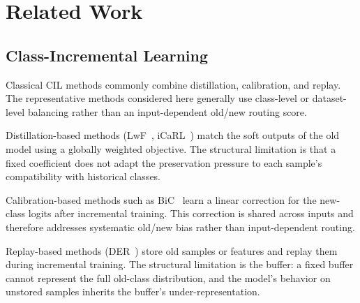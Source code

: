 %
%

\section{Related Work}\label{sec:related}


\subsection{Class-Incremental Learning}

Classical CIL methods commonly combine distillation, calibration, and replay. The representative methods considered here generally use class-level or dataset-level balancing rather than an input-dependent old/new routing score.

Distillation-based methods (LwF~\cite{li2017lwf}, iCaRL~\cite{rebuffi2017icarl}) match the soft outputs of the old model using a globally weighted objective. The structural limitation is that a fixed coefficient does not adapt the preservation pressure to each sample's compatibility with historical classes.

Calibration-based methods such as BiC~\cite{wu2019bic} learn a linear correction for the new-class logits after incremental training. This correction is shared across inputs and therefore addresses systematic old/new bias rather than input-dependent routing.

Replay-based methods (DER~\cite{yan2021der}) store old samples or features and replay them during incremental training. The structural limitation is the buffer: a fixed buffer cannot represent the full old-class distribution, and the model's behavior on unstored samples inherits the buffer's under-representation.

